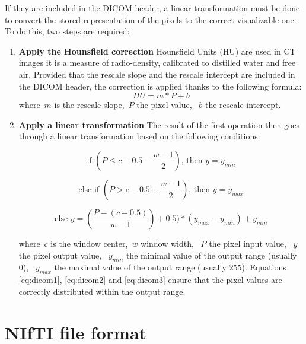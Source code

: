\noindent If they are included in the DICOM header, a linear transformation must be done to convert the stored representation of the pixels to the correct visualizable one. To do this, two steps are required: 

\begin{enumerate}
	\item \textbf{Apply the Hounsfield correction}\newline
	Hounsfield Units (HU) are used in CT images it is a measure of radio-density, calibrated to distilled water and free air. Provided that the rescale slope and the rescale intercept are included in the DICOM header, the correction is applied thanks to the following formula:
\begin{equation}
	HU = m * P + b
\end{equation}
	where~$m$ is the rescale slope,~$P$ the pixel value, ~$b$ the rescale intercept.

	\item \textbf{Apply a linear transformation}\newline
	The result of the first operation then goes through a linear transformation based on the following conditions: 

\begin{equation}\label{eq:dicom1}
\textrm{if } (P \leq c - 0.5 - \frac{w-1}{2}) \textrm{, then }y = y_{min}
\end{equation}

\begin{equation}\label{eq:dicom2}
\textrm{else if } (P > c - 0.5 + \frac{w-1}{2}) \textrm{, then }y = y_{max}
\end{equation}

\begin{equation}\label{eq:dicom3}
\textrm{else } y = (\frac{P - (c - 0.5)}{w-1}) + 0.5) * (y_{max} - y_{min}) + y_{min}
\end{equation}

where~$c$ is the window center,~$w$ window width, ~$P$ the pixel input value, ~$y$ the pixel output value, ~$y_{min}$ the minimal value of the output range (usually 0), ~$y_{max}$ the maximal value of the output range (usually 255). Equations \ref{eq:dicom1}, \ref{eq:dicom2} and \ref{eq:dicom3} ensure that the pixel values are correctly distributed within the output range. 

\end{enumerate}


\section{NIfTI file format}

